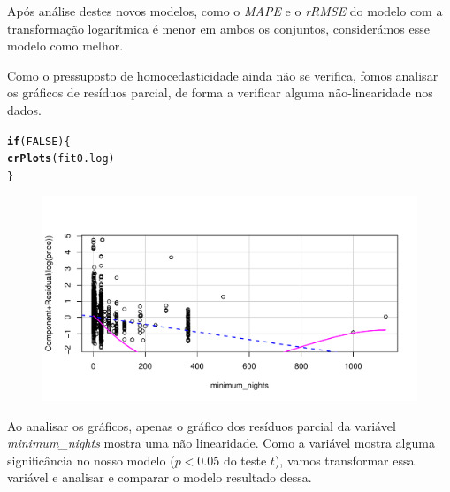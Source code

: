 \documentclass[justified, 11pt]{scrartcl}\usepackage[]{graphicx}\usepackage[]{xcolor}
\makeatletter
\def\maxwidth{ %
  \ifdim\Gin@nat@width>\linewidth
    \linewidth
  \else
    \Gin@nat@width
  \fi
}
\newcommand{\hlnum}[1]{\textcolor[rgb]{0.686,0.059,0.569}{#1}}%
\newcommand{\hlstd}[1]{\textcolor[rgb]{0.345,0.345,0.345}{#1}}%
\newcommand{\hlkwa}[1]{\textcolor[rgb]{0.161,0.373,0.58}{\textbf{#1}}}%
\newcommand{\hlkwd}[1]{\textcolor[rgb]{0.737,0.353,0.396}{\textbf{#1}}}%
\newenvironment{kframe}{%
 \def\at@end@of@kframe{}%
 \ifinner\ifhmode%
  \def\at@end@of@kframe{\end{minipage}}%
  \begin{minipage}{\columnwidth}%
 \fi\fi%
 \def\FrameCommand##1{\hskip\@totalleftmargin \hskip-\fboxsep
 \colorbox{shadecolor}{##1}\hskip-\fboxsep
     \hskip-\linewidth \hskip-\@totalleftmargin \hskip\columnwidth}%
 \MakeFramed {\advance\hsize-\width
   \@totalleftmargin\z@ \linewidth\hsize
   \@setminipage}}%
 {\par\unskip\endMakeFramed%
 \at@end@of@kframe}
\newenvironment{knitrout}{}{} %
\makeatother
\begin{document}
Após análise destes novos modelos, como o \textit{MAPE} e o \textit{rRMSE} do modelo com a transformação logarítmica é menor em ambos os conjuntos, considerámos esse modelo como melhor.

Como o pressuposto de homocedasticidade ainda não se verifica, fomos analisar os gráficos de resíduos parcial, de forma a verificar alguma não-linearidade nos dados.\\

\begin{knitrout}
\color{fgcolor}\begin{kframe}
\begin{alltt}
\hlkwa{if}\hlstd{(}\hlnum{FALSE}\hlstd{)\{}
  \hlkwd{crPlots}\hlstd{(fit0.log)}
\hlstd{\}}
\end{alltt}
\end{kframe}
\end{knitrout}
\begin{figure}
  \includegraphics[width=\maxwidth]{figure/manual-chunk-crPlots}
\end{figure}
Ao analisar os gráficos, apenas o gráfico dos resíduos parcial da variável \textit{minimum\_nights} mostra uma não linearidade. Como a variável mostra alguma significância no nosso modelo ($p < 0.05$ do teste $t$), vamos transformar essa variável e analisar e comparar o modelo resultado dessa.
\end{document}
